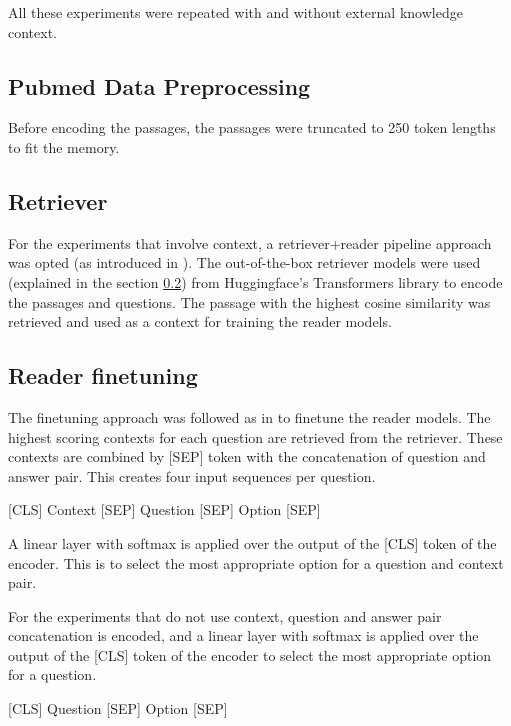 \documentclass[pmlr,twocolumn,10pt]{jmlr}
\begin{document}
All these experiments were repeated with and without external knowledge context.

\subsection{Pubmed Data Preprocessing}
Before encoding the passages, the passages were truncated to 250 token lengths to fit the memory.

\subsection{Retriever}
\label{apd:rt}
For the experiments that involve context, a retriever+reader pipeline approach was opted  (as introduced in \citep{Chen2017}). The out-of-the-box retriever models were used  (explained in the section \ref{apd:rt}) from Huggingface's Transformers library \citep{Wolf2020} to encode the passages and questions. The passage with the highest cosine similarity was retrieved and used as a context for training the reader models.

\subsection{Reader finetuning}
The finetuning approach was followed as in \citep{Devlin2019} to finetune the reader models. The highest scoring contexts for each question are retrieved from the retriever. These contexts are combined by \colorbox{mygreen}{ \footnotesize  [SEP] } token with the concatenation of question and answer pair. This creates four input sequences per question.


\colorbox{mygreen}{ \footnotesize [CLS] }Context\colorbox{mygreen} { \footnotesize [SEP] }Question\colorbox{mygreen}{ \footnotesize  [SEP] } Option\colorbox{mygreen}{ \footnotesize [SEP] }

A linear layer with softmax is applied over the output of the \colorbox{mygreen}{ \footnotesize  [CLS]} token of the encoder. This is to select the most appropriate option for a question and context pair.

For the experiments that do not use context, question and answer pair concatenation is encoded, and a linear layer with softmax is applied over the output of the \colorbox{mygreen}{ \footnotesize  [CLS] } token of the encoder to select the most appropriate option for a question.

\colorbox{mygreen}{ \footnotesize [CLS] } Question \colorbox{mygreen}{ \footnotesize  [SEP] } Option \colorbox{mygreen}{ \footnotesize [SEP] }
\end{document}

